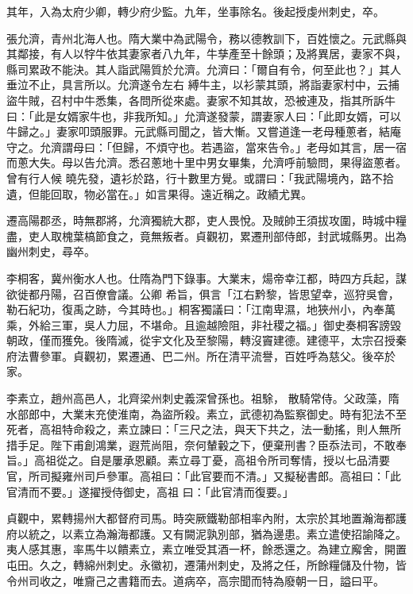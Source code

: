 \begin{pinyinscope}
 其年，入為太府少卿，轉少府少監。九年，坐事除名。後起授虔州刺史，卒。



 張允濟，青州北海人也。隋大業中為武陽令，務以德教訓下，百姓懷之。元武縣與其鄰接，有人以牸牛依其妻家者八九年，牛孳產至十餘頭；及將異居，妻家不與，縣司累政不能決。其人詣武陽質於允濟。允濟曰：「爾自有令，何至此也？」其人垂泣不止，具言所以。允濟遂令左右
 縛牛主，以衫蒙其頭，將詣妻家村中，云捕盜牛賊，召村中牛悉集，各問所從來處。妻家不知其故，恐被連及，指其所訴牛曰：「此是女婿家牛也，非我所知。」允濟遂發蒙，謂妻家人曰：「此即女婿，可以牛歸之。」妻家叩頭服罪。元武縣司聞之，皆大慚。又嘗道逢一老母種蔥者，結庵守之。允濟謂母曰：「但歸，不煩守也。若遇盜，當來告令。」老母如其言，居一宿而蔥大失。母以告允濟。悉召蔥地十里中男女畢集，允濟呼前驗問，果得盜蔥者。曾有行人候
 曉先發，遺衫於路，行十數里方覺。或謂曰：「我武陽境內，路不拾遺，但能回取，物必當在。」如言果得。遠近稱之。政績尤異。



 遷高陽郡丞，時無郡將，允濟獨統大郡，吏人畏悅。及賊帥王須拔攻圍，時城中糧盡，吏人取槐葉槁節食之，竟無叛者。貞觀初，累遷刑部侍郎，封武城縣男。出為幽州刺史，尋卒。



 李桐客，冀州衡水人也。仕隋為門下錄事。大業末，煬帝幸江都，時四方兵起，謀欲徙都丹陽，召百僚會議。公卿
 希旨，俱言「江右黔黎，皆思望幸，巡狩吳會，勒石紀功，復禹之跡，今其時也。」桐客獨議曰：「江南卑濕，地狹州小，內奉萬乘，外給三軍，吳人力屈，不堪命。且逾越險阻，非社稷之福。」御史奏桐客謗毀朝政，僅而獲免。後隋滅，從宇文化及至黎陽，轉沒竇建德。建德平，太宗召授秦府法曹參軍。貞觀初，累遷通、巴二州。所在清平流譽，百姓呼為慈父。後卒於家。



 李素立，趙州高邑人，北齊梁州刺史義深曾孫也。祖駼，
 散騎常侍。父政藻，隋水部郎中，大業末充使淮南，為盜所殺。素立，武德初為監察御史。時有犯法不至死者，高祖特命殺之，素立諫曰：「三尺之法，與天下共之，法一動搖，則人無所措手足。陛下甫創鴻業，遐荒尚阻，奈何輦轂之下，便棄刑書？臣忝法司，不敢奉旨。」高祖從之。自是屢承恩顧。素立尋丁憂，高祖令所司奪情，授以七品清要官，所司擬雍州司戶參軍。高祖曰：「此官要而不清。」又擬秘書郎。高祖曰：「此官清而不要。」遂擢授侍御史，高祖
 曰：「此官清而復要。」



 貞觀中，累轉揚州大都督府司馬。時突厥鐵勒部相率內附，太宗於其地置瀚海都護府以統之，以素立為瀚海都護。又有闕泥孰別部，猶為邊患。素立遣使招諭降之。夷人感其惠，率馬牛以饋素立，素立唯受其酒一杯，餘悉還之。為建立廨舍，開置屯田。久之，轉綿州刺史。永徽初，遷蒲州刺史，及將之任，所餘糧儲及什物，皆令州司收之，唯齎己之書籍而去。道病卒，高宗聞而特為廢朝一日，謚曰平。




\end{pinyinscope}
